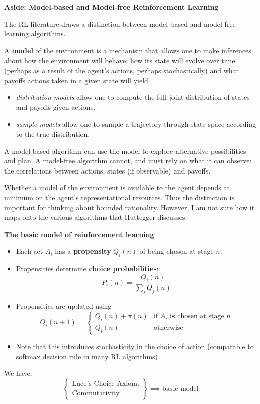 \documentclass{my-tufte}
\begin{document}
\textbf{Aside: Model-based and Model-free Reinforcement Learning}

The RL literature draws a distinction between model-based and model-free learning algorithms.

A \textbf{model} of the environment is a mechanism that allows one to make inferences about how the environment will behave: how its state will evolve over time (perhaps as a result of the agent's actions, perhaps stochastically) and what payoffs actions taken in a given state will yield.
\begin{itemize}
	\item \emph{distribution models} allow one to compute the full joint distribution of states and payoffs given actions.
	\item \emph{sample models} allow one to sample a trajectory through state space according to the true distribution.
\end{itemize}
A model-based algorithm can use the model to explore alternative possibilities and plan. A model-free algorithm cannot, and must rely on what it can observe: the correlations between actions, states (if observable) and payoffs.

Whether a model of the environment is available to the agent depends at minimum on the agent's representational resources. Thus the distinction is important for thinking about bounded rationality. However, I am not sure how it maps onto the various algorithms that Huttegger discusses.

\textbf{The basic model of reinforcement learning}

\begin{itemize}
	\item Each act $A_i$ has a \textbf{propensity} $Q_i(n)$ of being chosen at stage $n$.
	\item Propensities determine \textbf{choice probabilities}:
	\[
		P_i(n) = \frac{Q_i(n)}{\sum_j Q_j(n)}
	\]
	\item Propensities are updated using
	\[
		Q_i(n+1) = \left \{ \begin{array}{ll} Q_i(n) + \pi(n) & \text{if $A_i$ is chosen at stage $n$}\\ Q_i(n) & \text{otherwise} \end{array} \right .
	\]
	\item Note that this introduces stochasticity in the choice of action (comparable to softmax decision rule in many RL algorithms).
\end{itemize}
We have:
\[
\left \{ \begin{array}{l}
		\text{Luce's Choice Axiom,}\\
		\text{Commutativity}
	\end{array} \right \}
	\implies
	\text{basic model}
\]
\end{document}
